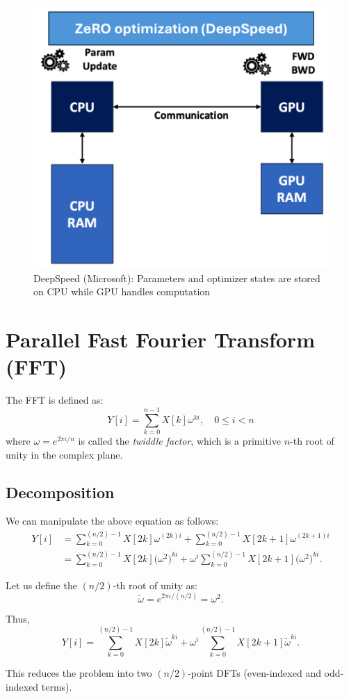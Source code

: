 \documentclass[12pt]{book}
\begin{document}
\begin{itemize}
    \begin{figure}[ht]
        \centering
        \includegraphics[width=0.5\linewidth]{images/DeepSpeed.png}
        \caption{DeepSpeed (Microsoft): Parameters and optimizer states are stored on CPU while GPU handles computation}
        \label{fig:DeepSpeed}
    \end{figure}
\end{itemize}


\section{Parallel Fast Fourier Transform (FFT)}

The FFT is defined as:
\[
Y[i] = \sum_{k=0}^{n-1} X[k]\omega^{ki}, \quad 0 \leq i < n
\]
where $\omega = e^{2\pi \iota /n}$ is called the \textit{twiddle factor}, which is a primitive $n$-th root of unity in the complex plane.

\subsection*{Decomposition}
We can manipulate the above equation as follows:
\begin{align*}
Y[i] &= \sum_{k=0}^{(n/2)-1} X[2k]\omega^{(2k)i} + \sum_{k=0}^{(n/2)-1} X[2k+1]\omega^{(2k+1)i} \\
&= \sum_{k=0}^{(n/2)-1} X[2k]\big(\omega^2\big)^{ki} + \omega^i \sum_{k=0}^{(n/2)-1} X[2k+1]\big(\omega^2\big)^{ki}.
\end{align*}

Let us define the $(n/2)$-th root of unity as:
\[
\tilde{\omega} = e^{2\pi \iota /(n/2)} = \omega^2.
\]

Thus,
\[
Y[i] = \sum_{k=0}^{(n/2)-1} X[2k]\tilde{\omega}^{ki} + \omega^i \sum_{k=0}^{(n/2)-1} X[2k+1]\tilde{\omega}^{ki}.
\]

This reduces the problem into two $(n/2)$-point DFTs (even-indexed and odd-indexed terms).
\end{document}
